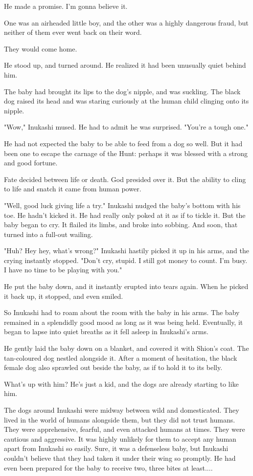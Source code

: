 He made a promise. I'm gonna believe it.

One was an airheaded little boy, and the other was a highly dangerous
fraud, but neither of them ever went back on their word.

They would come home.

He stood up, and turned around. He realized it had been unusually quiet
behind him.

The baby had brought its lips to the dog's nipple, and was suckling. The
black dog raised its head and was staring curiously at the human child
clinging onto its nipple.

"Wow," Inukashi mused. He had to admit he was surprised. "You're a tough
one."

He had not expected the baby to be able to feed from a dog so well. But
it had been one to escape the carnage of the Hunt: perhaps it was
blessed with a strong and good fortune.

Fate decided between life or death. God presided over it. But the
ability to cling to life and snatch it came from human power.

"Well, good luck giving life a try." Inukashi nudged the baby's bottom
with his toe. He hadn't kicked it. He had really only poked at it as if
to tickle it. But the baby began to cry. It flailed its limbs, and broke
into sobbing. And soon, that turned into a full-out wailing.

"Huh? Hey hey, what's wrong?" Inukashi hastily picked it up in his arms,
and the crying instantly stopped. "Don't cry, stupid. I still got money
to count. I'm busy. I have no time to be playing with you."

He put the baby down, and it instantly erupted into tears again. When he
picked it back up, it stopped, and even smiled.

So Inukashi had to roam about the room with the baby in his arms. The
baby remained in a splendidly good mood as long as it was being held.
Eventually, it began to lapse into quiet breaths as it fell asleep in
Inukashi's arms.

He gently laid the baby down on a blanket, and covered it with Shion's
coat. The tan-coloured dog nestled alongside it. After a moment of
hesitation, the black female dog also sprawled out beside the baby, as
if to hold it to its belly.

What's up with him? He's just a kid, and the dogs are already starting
to like him.

The dogs around Inukashi were midway between wild and domesticated. They
lived in the world of humans alongside them, but they did not trust
humans. They were apprehensive, fearful, and even attacked humans at
times. They were cautious and aggressive. It was highly unlikely for
them to accept any human apart from Inukashi so easily. Sure, it was a
defenseless baby, but Inukashi couldn't believe that they had taken it
under their wing so promptly. He had even been prepared for the baby to
receive two, three bites at least....

